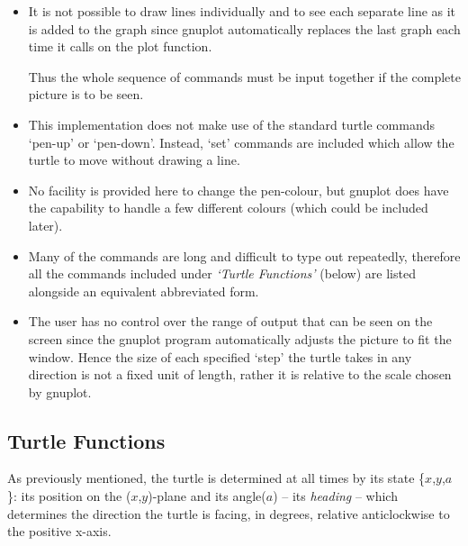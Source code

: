 \begin{itemize}
 \item It is not possible to draw lines individually and to see each
        separate line as it is added to the graph since gnuplot
        automatically replaces the last graph each time it calls on
        the plot function.

       Thus the whole sequence of commands must be input together if
        the complete picture is to be seen.
 \item This implementation does not make use of the standard turtle
        commands `pen-up' or `pen-down'. Instead, `set' commands are
        included which allow the turtle to move without drawing a line.
 \item No facility is provided here to change the pen-colour, but gnuplot
        does have the capability to handle a few different colours (which
        could be included later).
 \item Many of the commands are long and difficult to type out repeatedly,
        therefore all the commands included under \emph{`Turtle Functions'}
        (below) are listed alongside an equivalent abbreviated form.
 \item The user has no control over the range of output that can be seen
        on the screen since the gnuplot program automatically adjusts the
        picture to fit the window. Hence the size of each specified `step'
        the turtle takes in any direction is not a fixed unit of length,
        rather it is relative to the scale chosen by gnuplot.
\end{itemize}


\subsection{Turtle Functions}
 As previously mentioned, the turtle is determined at all times by its
state \{$x$,$y$,$a$\}: its position on the \mbox{($x$,$y$)-plane} and its
angle($a$) -- its \emph{heading} -- which determines the direction the
turtle is facing, in degrees, relative anticlockwise to the positive
x-axis.

